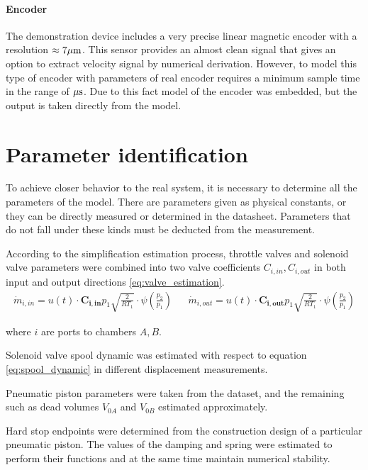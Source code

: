 \paragraph{Encoder}
The demonstration device includes a very precise linear magnetic encoder
with a resolution $\approx 7 \rm \mu m$. This sensor provides an almost
clean signal that gives an option to extract velocity signal by numerical
derivation.  However, to model this type of encoder with parameters of real
encoder requires a minimum sample time in the range of $\rm \mu s$. Due to
this fact model of the encoder was embedded, but the output is taken
directly from the model.

\section{Parameter identification}
To achieve closer behavior to the real system, it is necessary to determine
all the parameters of the model.  There are parameters given as physical
constants, or they can be directly measured or determined in the datasheet.
Parameters that do not fall under these kinds must be deducted from the
measurement.

According to the simplification estimation process, throttle valves and
solenoid valve parameters were combined into two valve coefficients
$C_{i,in}, C_{i,out}$ in both input and output directions \ref{eq:valve_estimation}.
\begin{align}
    \dot{m}_{i,in} = u(t)\cdot \boldsymbol{C_{i,in}} p_1 \sqrt{\frac{2}{RT_1}}
    \cdot \psi\left(\frac{p_2}{p_1}\right) &&
    \dot{m}_{i,out} = u(t)\cdot \boldsymbol{C_{i,out}} p_1 \sqrt{\frac{2}{RT_1}}
    \cdot \psi\left(\frac{p_2}{p_1}\right)
    \label{eq:valve_estimation}
\end{align}

where $i$ are ports to chambers $A, B$.


Solenoid valve spool dynamic was estimated with respect to equation
\ref{eq:spool_dynamic}
in different displacement measurements. 

Pneumatic piston parameters were taken from the dataset, and the remaining
such as dead volumes $V_{0A}$ and $V_{0B}$ estimated approximately.

Hard stop endpoints were determined from the construction design of a
particular pneumatic piston. The values of the damping and spring were
estimated to perform their functions and at the same time maintain
numerical stability.


